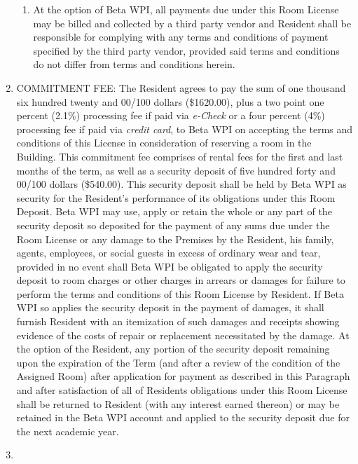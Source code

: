 \documentclass[legalpaper, 12pt]{article}
\begin{document}
\begin{enumerate}
\begin{enumerate}[label=\Alph*.]
\item At the option of Beta WPI, all payments due under this Room License may be billed and collected by a third party vendor and Resident shall be responsible for complying with any terms and conditions of payment specified by the third party vendor, provided said terms and conditions do not differ from terms and conditions herein.

\end{enumerate}

\item\label{itm:commitmentfee}

COMMITMENT FEE\@: The Resident agrees to pay the sum of one thousand six hundred twenty and 00/100 dollars (\$1620.00), plus a two point one percent (2.1\%) processing fee if paid via \textit{e-Check} or a four percent (4\%) processing fee if paid via \textit{credit card}, to Beta WPI on accepting the terms and conditions of this License in consideration of reserving a room in the Building.
This commitment fee comprises of rental fees for the first and last months of the term, as well as a security deposit of five hundred forty and 00/100 dollars (\$540.00).
This security deposit shall be held by Beta WPI as security for the Resident’s performance of its obligations under this Room Deposit.
Beta WPI may use, apply or retain the whole or any part of the security deposit so deposited for the payment of any sums due under the Room License or any damage to the Premises by the Resident, his family, agents, employees, or social guests in excess of ordinary wear and tear, provided in no event shall Beta WPI be obligated to apply the security deposit to room charges or other charges in arrears or damages for failure to perform the terms and conditions of this Room License by Resident.
If Beta WPI so applies the security deposit in the payment of damages, it shall furnish Resident with an itemization of such damages and receipts showing evidence of the costs of repair or replacement necessitated by the damage.
At the option of the Resident, any portion of the security deposit remaining upon the expiration of the Term (and after a review of the condition of the Assigned Room) after application for payment as described in this Paragraph and after satisfaction of all of Residents obligations under this Room License shall be returned to Resident (with any interest earned thereon) or may be retained in the Beta WPI account and applied to the security deposit due for the next academic year.

\item\label{itm:mealplan}


\end{enumerate}
\end{document}
